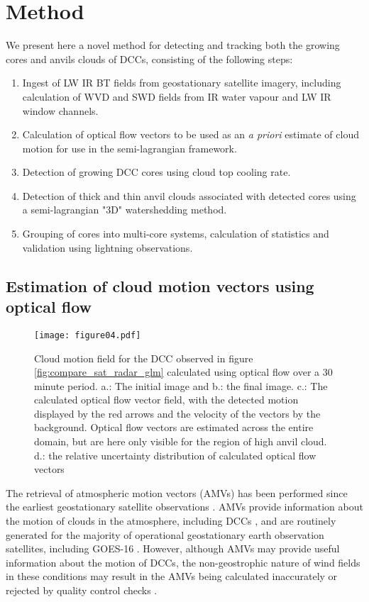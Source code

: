 \section{Method}

We present here a novel method for detecting and tracking both the growing cores and anvils clouds of DCCs, consisting of the following steps:

\begin{enumerate}
    \item Ingest of LW IR BT fields from geostationary satellite imagery, including calculation of WVD and SWD fields from IR water vapour and LW IR window channels.
    \item Calculation of optical flow vectors to be used as an \textit{a priori} estimate of cloud motion for use in the semi-lagrangian framework.
    \item Detection of growing DCC cores using cloud top cooling rate.
    \item Detection of thick and thin anvil clouds associated with detected cores using a semi-lagrangian "3D" watershedding method. 
    \item Grouping of cores into multi-core systems, calculation of statistics and validation using lightning observations.
\end{enumerate}



\subsection{Estimation of cloud motion vectors using optical flow}

\begin{figure*}[t]
    \texttt{[image: figure04.pdf]}
    \caption{Cloud motion field for the DCC observed in figure \ref{fig:compare_sat_radar_glm} calculated using optical flow over a 30 minute period. a.: The initial image and b.: the final image. c.: The calculated optical flow vector field, with the detected motion displayed by the red arrows and the velocity of the vectors by the background. Optical flow vectors are estimated across the entire domain, but are here only visible for the region of high anvil cloud. d.: the relative uncertainty distribution of calculated optical flow vectors}
    \label{fig:optical_flow}
\end{figure*}


The retrieval of atmospheric motion vectors (AMVs) has been performed since the earliest geostationary satellite observations \citep{menzel_cloud_2001}.
AMVs provide information about the motion of clouds in the atmosphere, including DCCs \citep{bedka_application_2005}, and are routinely generated for the majority of operational geostationary earth observation satellites, including GOES-16 \citep{daniels_algorithm_nodate}. 
However, although AMVs may provide useful information about the motion of DCCs, the non-geostrophic nature of wind fields in these conditions may result in the AMVs being calculated inaccurately or rejected by quality control checks \citep{bedka_application_2005}.

